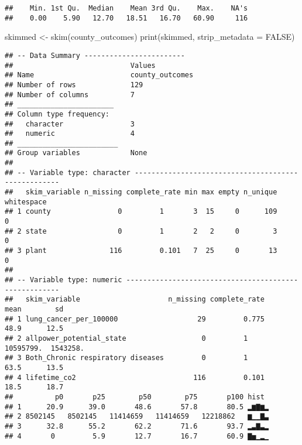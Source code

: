 \documentclass[
]{article}
\newenvironment{Shaded}{\begin{snugshade}}{\end{snugshade}}
\newcommand{\AttributeTok}[1]{\textcolor[rgb]{0.77,0.63,0.00}{#1}}
\newcommand{\ConstantTok}[1]{\textcolor[rgb]{0.00,0.00,0.00}{#1}}
\newcommand{\FunctionTok}[1]{\textcolor[rgb]{0.00,0.00,0.00}{#1}}
\newcommand{\NormalTok}[1]{#1}
\newcommand{\OtherTok}[1]{\textcolor[rgb]{0.56,0.35,0.01}{#1}}
\newcommand{\SpecialCharTok}[1]{\textcolor[rgb]{0.00,0.00,0.00}{#1}}
\begin{document}
\begin{Shaded}
\end{Shaded}

\begin{verbatim}
##    Min. 1st Qu.  Median    Mean 3rd Qu.    Max.    NA's 
##    0.00    5.90   12.70   18.51   16.70   60.90     116
\end{verbatim}

\begin{Shaded}
\begin{Highlighting}[]
\NormalTok{skimmed }\OtherTok{\textless{}{-}} \FunctionTok{skim}\NormalTok{(county\_outcomes)}
\FunctionTok{print}\NormalTok{(skimmed, }\AttributeTok{strip\_metadata =} \ConstantTok{FALSE}\NormalTok{)}
\end{Highlighting}
\end{Shaded}

\begin{verbatim}
## -- Data Summary ------------------------
##                            Values         
## Name                       county_outcomes
## Number of rows             129            
## Number of columns          7              
## _______________________                   
## Column type frequency:                    
##   character                3              
##   numeric                  4              
## ________________________                  
## Group variables            None           
## 
## -- Variable type: character ----------------------------------------------------
##   skim_variable n_missing complete_rate min max empty n_unique whitespace
## 1 county                0         1       3  15     0      109          0
## 2 state                 0         1       2   2     0        3          0
## 3 plant               116         0.101   7  25     0       13          0
## 
## -- Variable type: numeric ------------------------------------------------------
##   skim_variable                     n_missing complete_rate       mean        sd
## 1 lung_cancer_per_100000                   29         0.775       48.9      12.5
## 2 allpower_potential_state                  0         1     10595799.  1543258. 
## 3 Both_Chronic respiratory diseases         0         1           63.5      13.5
## 4 lifetime_co2                            116         0.101       18.5      18.7
##          p0       p25        p50        p75       p100 hist 
## 1      20.9      39.0       48.6       57.8       80.5 ▂▆▇▆▂
## 2 8502145   8502145   11414659   11414659   12218862   ▆▁▁▇▃
## 3      32.8      55.2       62.2       71.6       93.7 ▂▃▇▃▂
## 4       0         5.9       12.7       16.7       60.9 ▇▅▁▂▁
\end{verbatim}
\end{document}
